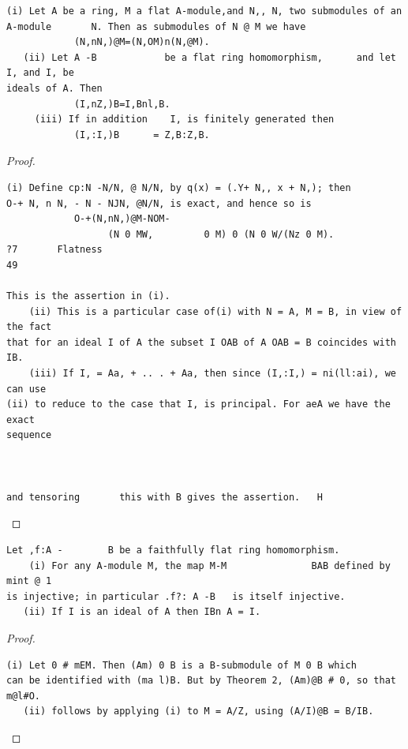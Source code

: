 \begin{theorem}\label{mcrt-auto-theorem-7-4}\uses{}
\begin{verbatim}
(i) Let A be a ring, M a flat A-module,and N,, N, two submodules of an
A-module       N. Then as submodules of N @ M we have
            (N,nN,)@M=(N,OM)n(N,@M).
   (ii) Let A -B            be a flat ring homomorphism,      and let I, and I, be
ideals of A. Then
            (I,nZ,)B=I,Bnl,B.
     (iii) If in addition    I, is finitely generated then
            (I,:I,)B      = Z,B:Z,B.
\end{verbatim}
\end{theorem}
\begin{proof}
\begin{verbatim}
(i) Define cp:N -N/N, @ N/N, by q(x) = (.Y+ N,, x + N,); then
O-+ N, n N, - N - NJN, @N/N, is exact, and hence so is
            O-+(N,nN,)@M-NOM-
                  (N 0 MW,         0 M) 0 (N 0 W/(Nz 0 M).
?7       Flatness                                                           49

This is the assertion in (i).
    (ii) This is a particular case of(i) with N = A, M = B, in view of the fact
that for an ideal I of A the subset I OAB of A OAB = B coincides with IB.
    (iii) If I, = Aa, + .. . + Aa, then since (I,:I,) = ni(ll:ai), we can use
(ii) to reduce to the case that I, is principal. For aeA we have the exact
sequence



and tensoring       this with B gives the assertion.   H
\end{verbatim}
\end{proof}


\begin{theorem}\label{mcrt-auto-theorem-7-5}\uses{}
\begin{verbatim}
Let ,f:A -        B be a faithfully flat ring homomorphism.
    (i) For any A-module M, the map M-M               BAB defined by mint @ 1
is injective; in particular .f?: A -B   is itself injective.
   (ii) If I is an ideal of A then IBn A = I.
\end{verbatim}
\end{theorem}
\begin{proof}
\begin{verbatim}
(i) Let 0 # mEM. Then (Am) 0 B is a B-submodule of M 0 B which
can be identified with (ma l)B. But by Theorem 2, (Am)@B # 0, so that
m@l#O.
   (ii) follows by applying (i) to M = A/Z, using (A/I)@B = B/IB.
\end{verbatim}
\end{proof}


